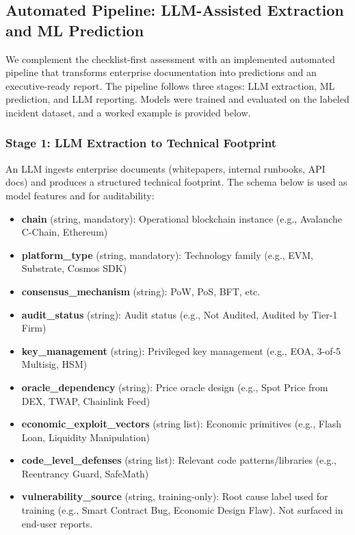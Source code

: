 \begin{multicols}{2}

\subsection{Automated Pipeline: LLM-Assisted Extraction and ML Prediction}
\label{sec:ml_pipeline}

We complement the checklist-first assessment with an implemented automated pipeline that transforms enterprise documentation into predictions and an executive-ready report. The pipeline follows three stages: LLM extraction, ML prediction, and LLM reporting. Models were trained and evaluated on the labeled incident dataset, and a worked example is provided below.

\subsubsection{Stage 1: LLM Extraction to Technical Footprint}
An LLM ingests enterprise documents (whitepapers, internal runbooks, API docs) and produces a structured technical footprint. The schema below is used as model features and for auditability:
\begin{itemize}
    \item \textbf{chain} (string, mandatory): Operational blockchain instance (e.g., Avalanche C-Chain, Ethereum)
    \item \textbf{platform\_type} (string, mandatory): Technology family (e.g., EVM, Substrate, Cosmos SDK)
    \item \textbf{consensus\_mechanism} (string): PoW, PoS, BFT, etc.
    \item \textbf{audit\_status} (string): Audit status (e.g., Not Audited, Audited by Tier-1 Firm)
    \item \textbf{key\_management} (string): Privileged key management (e.g., EOA, 3-of-5 Multisig, HSM)
    \item \textbf{oracle\_dependency} (string): Price oracle design (e.g., Spot Price from DEX, TWAP, Chainlink Feed)
    \item \textbf{economic\_exploit\_vectors} (string list): Economic primitives (e.g., Flash Loan, Liquidity Manipulation)
    \item \textbf{code\_level\_defenses} (string list): Relevant code patterns/libraries (e.g., Reentrancy Guard, SafeMath)
    \item \textbf{vulnerability\_source} (string, training-only): Root cause label used for training (e.g., Smart Contract Bug, Economic Design Flaw). Not surfaced in end-user reports.
\end{itemize}


\end{multicols}
